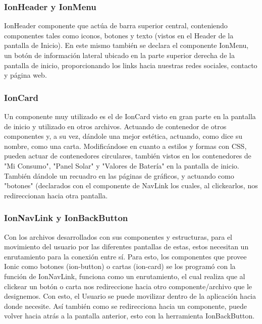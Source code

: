                 \subsubsection{IonHeader y IonMenu}
                    IonHeader componente que actúa de barra superior central, conteniendo componentes tales como iconos, botones y texto (vistos en el Header de la pantalla de Inicio). En este mismo también se declara el componente IonMenu, un botón de información lateral ubicado en la parte superior derecha de la pantalla de inicio, proporcionando los links hacia nuestras redes sociales, contacto y página web.\par
                
                \subsubsection{IonCard}
                    Un componente muy utilizado es el de IonCard visto en gran parte en la pantalla de inicio y utilizado en otros archivos. Actuando de contenedor de otros componentes y, a su vez, dándole una mejor estética, actuando, como dice su nombre, como una carta. Modificándose en cuanto a estilos y formas con CSS, pueden actuar de contenedores circulares, también vistos en los contenedores de "Mi Consumo", "Panel Solar" y "Valores de Batería" en la pantalla de inicio. También dándole un recuadro en las páginas de gráficos, y actuando como "botones" (declarados con el componente de NavLink los cuales, al clickearlos, nos redireccionan hacia otra pantalla.\par
                    
                \subsubsection{IonNavLink y IonBackButton}
                    Con los archivos desarrollados con sus componentes y estructuras, para el movimiento del usuario por las diferentes pantallas de estas, estos necesitan un enrutamiento para la conexión entre sí. Para esto, los componentes que provee Ionic como botones (ion-button) o cartas (ion-card) se los programó con la función de IonNavLink, funciona como un enrutamiento, el cual realiza que al clickear un botón o carta nos redireccione hacia otro componente/archivo que le designemos. Con esto, el Usuario se puede movilizar dentro de la aplicación hacia donde necesite. Así también como se redirecciona hacia un componente, puede volver hacia atrás a la pantalla anterior, esto con la herramienta IonBackButton.\par
                    
